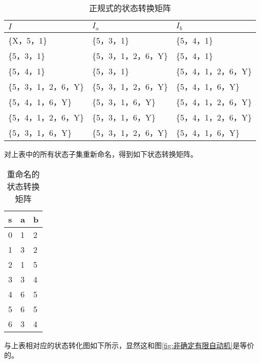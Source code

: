\begin{table}[H]
    \centering
    \caption{正规式的状态转换矩阵}
    \label{table:正规式的状态转换矩阵}
    \setlength{\tabcolsep}{5mm}
    \begin{tabular}{l|ll}
        \toprule
        \textbf{$I$} & \textbf{$I_a$} & \textbf{$I_b$} \\
        \midrule
        \{X，5，1\} & \{5，3，1\} & \{5，4，1\} \\
        \{5，3，1\} & \{5，3，1，2，6，Y\} & \{5，4，1\} \\
        \{5，4，1\} & \{5，3，1\} & \{5，4，1，2，6，Y\} \\
        \{5，3，1，2，6，Y\} & \{5，3，1，2，6，Y\} & \{5，4，1，6，Y\} \\
        \{5，4，1，6，Y\} & \{5，3，1，6，Y\} & \{5，4，1，2，6，Y\} \\
        \{5，4，1，2，6，Y\} & \{5，3，1，6，Y\} & \{5，4，1，2，6，Y\} \\
        \{5，3，1，6，Y\} & \{5，3，1，2，6，Y\} & \{5，4，1，6，Y\} \\
        \bottomrule
    \end{tabular}
\end{table}

对上表中的所有状态子集重新命名，得到如下状态转换矩阵。

\begin{table}[H]
    \centering
    \caption{重命名的状态转换矩阵}
    \label{table:重命名的状态转换矩阵}
    \setlength{\tabcolsep}{15mm}
    \begin{tabular}{l|ll}
        \toprule
        \textbf{s} & \textbf{a} & \textbf{b} \\
        \midrule
        0 & 1 & 2 \\
        1 & 3 & 2 \\
        2 & 1 & 5 \\
        3 & 3 & 4 \\
        4 & 6 & 5 \\
        5 & 6 & 5 \\
        6 & 3 & 4 \\
        \bottomrule
    \end{tabular}
\end{table}

与上表相对应的状态转化图如下所示，显然这和图\ref{fig:非确定有限自动机}是等价的。

